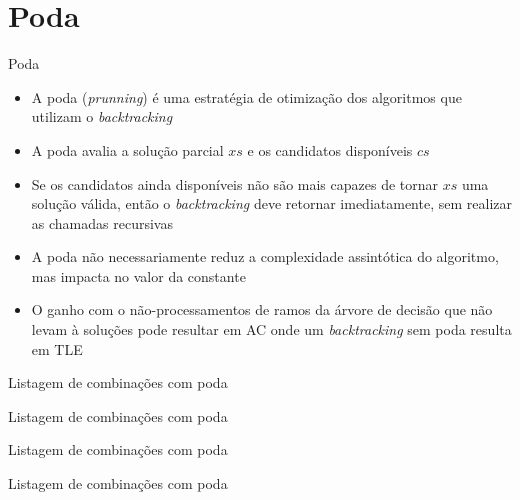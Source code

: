 \section{Poda}

\begin{frame}[fragile]{Poda}

    \begin{itemize}
        \item A poda (\textit{prunning}) é uma estratégia de otimização dos algoritmos que 
            utilizam o \textit{backtracking}

        \item A poda avalia a solução parcial $xs$ e os candidatos disponíveis $cs$

        \item Se os candidatos ainda disponíveis não são mais capazes de tornar $xs$ uma solução
            válida, então o \textit{backtracking} deve retornar imediatamente, sem realizar
            as chamadas recursivas

        \item A poda não necessariamente reduz a complexidade assintótica do algoritmo, mas 
            impacta no valor da constante 

        \item O ganho com o não-processamentos de ramos da árvore de decisão que não levam à
            soluções pode resultar em AC onde um \textit{backtracking} sem poda resulta em
            TLE
    \end{itemize}

\end{frame}

\begin{frame}[fragile]{Listagem de combinações com poda}
\end{frame}

\begin{frame}[fragile]{Listagem de combinações com poda}
\end{frame}

\begin{frame}[fragile]{Listagem de combinações com poda}
\end{frame}

\begin{frame}[fragile]{Listagem de combinações com poda}
\end{frame}
